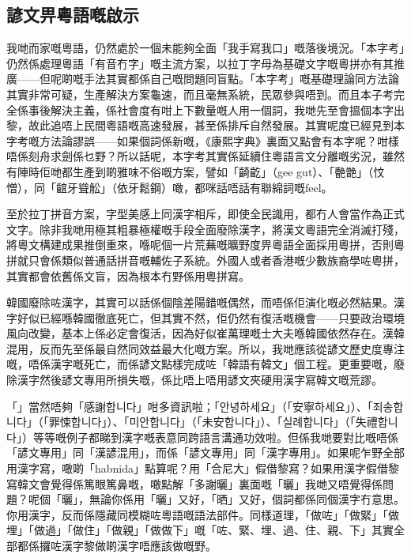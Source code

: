 \documentclass[a5paper, 10pt, openany]{book} %
\begin{document}
\subsection*{諺文畀粵語嘅啟示}

我哋而家嘅粵語，仍然處於一個未能夠全面「我手寫我口」嘅落後境況。「本字考」仍然係處理粵語「有音冇字」嘅主流方案，以拉丁字母為基礎文字嘅粵拼亦有其推廣——但呢啲嘅手法其實都係自己嘅問題同盲點。「本字考」嘅基礎理論同方法論其實非常可疑，生產解決方案龜速，而且毫無系統，民眾參與唔到。而且本子考完全係事後解決主義，係社會度有咁上下數量嘅人用一個詞，我哋先至會搵個本字出黎，故此追唔上民間粵語嘅高速發展，甚至係排斥自然發展。其實呢度已經見到本字考嘅方法論謬誤——如果個詞係新嘅，《康熙字典》裏面又點會有本字呢？咁樣唔係刻舟求劍係乜野？所以話呢，本字考其實係延續住粵語言文分離嘅劣況，雖然有陣時佢哋都生產到啲雅味不俗嘅方案，譬如「齮齕」（gee
gut）、「䒐䒏」（忟憎），同「𪘲牙聳䚗」（依牙鬆鋼）噉，都咪話唔話有聯綿詞嘅feel。


至於拉丁拼音方案，字型美感上同漢字相斥，即使全民識用，都冇人會當作為正式文字。除非我哋用極其粗暴極權嘅手段全面廢除漢字，將漢文粵語完全消滅打殘，將粵文構建成果推倒重來，喺呢個一片荒蕪嘅曠野度畀粵語全面採用粵拼，否則粵拼就只會係類似普通話拼音嘅輔佐子系統。外國人或者香港嘅少數族裔學咗粵拼，其實都會依舊係文盲，因為根本冇野係用粵拼寫。

韓國廢除咗漢字，其實可以話係個陰差陽錯嘅偶然，而唔係佢演化嘅必然結果。漢字好似已經喺韓國徹底死亡，但其實不然，佢仍然有復活嘅機會——只要政治環境風向改變，基本上係必定會復活，因為好似崔萬理嘅士大夫喺韓國依然存在。漢韓混用，反而先至係最自然同效益最大化嘅方案。所以，我哋應該從諺文歷史度專注嘅，唔係漢字嘅死亡，而係諺文點樣完成咗「韓語有韓文」個工程。更重要嘅，廢除漢字然後諺文專用所損失嘅，係比唔上唔用諺文夾硬用漢字寫韓文嘅荒謬。

「{\koreanfont {}}」當然唔夠「感謝{\koreanfont 합니다}」咁多資訊啦；「{\koreanfont 안녕하세요}」（「安寧{\koreanfont  하세요}」）、「{\koreanfont  죄송합니다}」（「罪悚{\koreanfont 합니다}」）、「{\koreanfont 미안합니다}」（「未安{\koreanfont 합니다}」）、「{\koreanfont  실례합니다}」（「失禮{\koreanfont 합니다}」）等等嘅例子都睇到漢字嘅表意同跨語言溝通功效啦。但係我哋要對比嘅唔係「諺文專用」同「漢諺混用」，而係「諺文專用」同「漢字專用」。如果呢乍野全部用漢字寫，噉啲「habnida」點算呢？用「合尼大」假借黎寫？如果用漢字假借黎寫韓文會覺得係篤眼篤鼻嘅，噉點解「多謝曬」裏面嘅「曬」我哋又唔覺得係問題？呢個「曬」，無論你係用「曬」又好，「晒」又好，個詞都係同個漢字冇意思。你用漢字，反而係隱藏同模糊咗粵語嘅語法部件。同樣道理，「做咗」「做緊」「做埋」「做過」「做住」「做親」「做做下」嘅「咗、緊、埋、過、住、親、下」其實全部都係攞咗漢字黎做啲漢字唔應該做嘅野。
\end{document}
